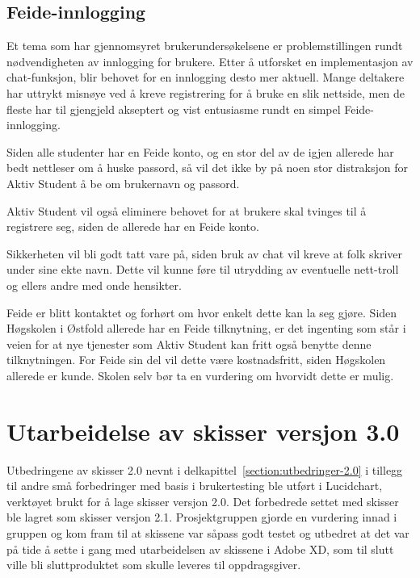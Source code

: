 \subsection{Feide-innlogging}
\label{section:feide}
Et tema som har gjennomsyret brukerundersøkelsene er problemstillingen rundt nødvendigheten av innlogging for brukere. Etter å utforsket en implementasjon av chat-funksjon, blir behovet for en innlogging desto mer aktuell. Mange deltakere har uttrykt misnøye ved å kreve registrering for å bruke en slik nettside, men de fleste har til gjengjeld akseptert og vist entusiasme rundt en simpel Feide-innlogging.

Siden alle studenter har en Feide konto, og en stor del av de igjen allerede har bedt nettleser om å huske passord, så vil det ikke by på noen stor distraksjon for Aktiv Student å be om brukernavn og passord.

Aktiv Student vil også eliminere behovet for at brukere skal tvinges til å registrere seg, siden de allerede har en Feide konto.

Sikkerheten vil bli godt tatt vare på, siden bruk av chat vil kreve at folk skriver under sine ekte navn. Dette vil kunne føre til utrydding av eventuelle nett-troll og ellers andre med onde hensikter.

Feide er blitt kontaktet og forhørt om hvor enkelt dette kan la seg gjøre. Siden Høgskolen i Østfold allerede har en Feide tilknytning, er det ingenting som står i veien for at nye tjenester som Aktiv Student kan fritt også benytte denne tilknytningen. For Feide sin del vil dette være kostnadsfritt, siden Høgskolen allerede er kunde. Skolen selv bør ta en vurdering om hvorvidt dette er mulig.


\section{Utarbeidelse av skisser versjon 3.0}

Utbedringene av skisser 2.0 nevnt i delkapittel~\ref{section:utbedringer-2.0} i tillegg til andre små forbedringer med basis i brukertesting ble utført i Lucidchart, verktøyet brukt for å lage skisser versjon 2.0. Det forbedrede settet med skisser ble lagret som skisser versjon 2.1. Prosjektgruppen gjorde en vurdering innad i gruppen og kom fram til at skissene var såpass godt testet og utbedret at det var på tide å sette i gang med utarbeidelsen av skissene i Adobe XD, som til slutt ville bli sluttproduktet som skulle leveres til oppdragsgiver.

